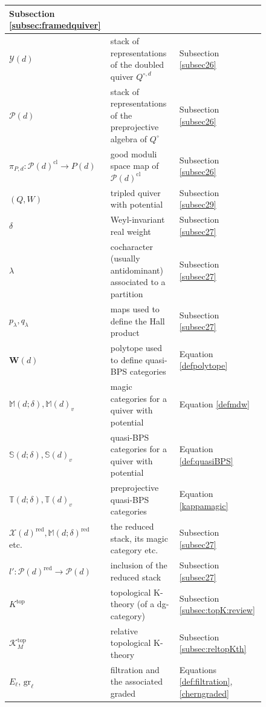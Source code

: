 \documentclass [11pt,oneside,a4paper,mathscr]{amsart}
\theoremstyle{definition}
\newcommand{\X}{\mathscr{X}}
\begin{document}
\begin{figure}
{\begin{tabular}{|l|l|l|}
Subsection \ref{subsec:framedquiver}
\\ \hline
$\mathscr{Y}(d)$ & stack of representations of the doubled quiver $Q^{\circ,d}$ &
Subsection \ref{subsec26}
\\ \hline
$\mathscr{P}(d)$ & stack of representations of the preprojective algebra of $Q^{\circ}$ &
Subsection \ref{subsec26}
\\ \hline
$\pi_{P,d}\colon\mathscr{P}(d)^{\mathrm{cl}}\to P(d)$ & good moduli space map of $\mathscr{P}(d)^{\mathrm{cl}}$ &
Subsection \ref{subsec26}
\\ \hline
$(Q,W)$ & tripled quiver with potential & 
Subsection \ref{subsec29}
\\ \hline
$\delta$ & Weyl-invariant real weight & 
Subsection \ref{subsec27}
\\ \hline
$\lambda$ & cocharacter (usually antidominant) associated to a partition & 
Subsection \ref{subsec27}
\\ \hline
$p_\lambda, q_\lambda$ & maps used to define the Hall product & 
Subsection \ref{subsec27}
\\ \hline
$\textbf{W}(d)$ & polytope used to define quasi-BPS categories
& Equation \eqref{defpolytope} 
\\ \hline
$\mathbb{M}(d; \delta), \mathbb{M}(d)_v$  & magic categories for a quiver with potential
& Equation \eqref{defmdw} 
\\ \hline
 $\mathbb{S}(d; \delta), \mathbb{S}(d)_v$ &  quasi-BPS categories for a quiver with potential
& Equation \eqref{def:quasiBPS} 
\\ \hline
$\mathbb{T}(d; \delta), \mathbb{T}(d)_v$ & preprojective quasi-BPS categories 
& Equation \eqref{kappamagic} 
\\ \hline
$\X(d)^{\mathrm{red}}, \mathbb{M}(d;\delta)^{\mathrm{red}}$ etc. & the reduced stack, its magic category etc. &
Subsection \ref{subsec27}
\\ \hline
$l'\colon\mathscr{P}(d)^{\mathrm{red}}\to\mathscr{P}(d)$ & inclusion of the reduced stack &
Subsection \ref{subsec27}
\\ \hline
$K^{\mathrm{top}}$ & topological K-theory (of a dg-category) &
Subsection \ref{subsec:topK:review}
\\ \hline
$\mathcal{K}_M^{\mathrm{top}}$ & relative topological K-theory &
Subsection \ref{subsec:reltopKth}
\\ \hline
$E_\ell$, $\mathrm{gr}_\ell$ & filtration and the associated graded & Equations \ref{def:filtration}, \eqref{cherngraded}
\\ \hline

\end{tabular}}
\end{figure}
\end{document}
